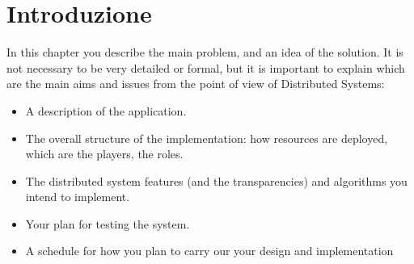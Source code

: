 \chapter{Introduzione}

In this chapter you describe the main problem, and an idea of the solution. It is not necessary to be very detailed or formal, but it is important to explain which are the main aims and issues from the point of view of Distributed Systems:

\begin{itemize}
	\item A description of the application.
	\item The overall structure of the implementation: how resources are deployed, which are the players, the roles.
	\item The distributed system features (and the transparencies) and algorithms you intend to implement.
	\item Your plan for testing the system.
	\item A schedule for how you plan to carry our your design and implementation
\end{itemize}
